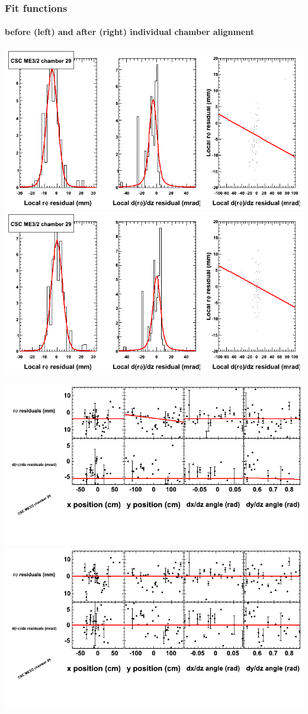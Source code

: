 \documentclass[compress]{beamer}
\begin{document}
\begin{frame}
\frametitle{Fit functions}
\framesubtitle{before (left) and after (right) individual chamber alignment}
\includegraphics[width=0.5\linewidth]{ringfits_3dof/beforefit_MEp32_29_bellcurve.png} \includegraphics[width=0.5\linewidth]{ringfits_3dof/afterfit_MEp32_29_bellcurve.png}

\includegraphics[width=0.5\linewidth]{ringfits_3dof/beforefit_MEp32_29_polynomials.png} \includegraphics[width=0.5\linewidth]{ringfits_3dof/afterfit_MEp32_29_polynomials.png}
\end{frame}
\end{document}
